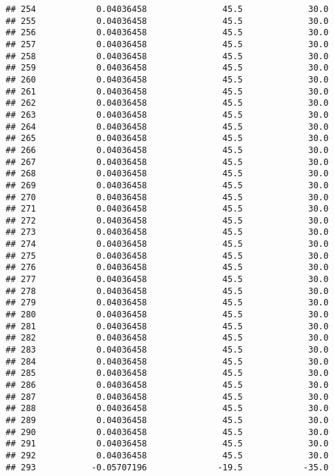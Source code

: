 \documentclass[]{article}
\begin{document}
\begin{verbatim}
## 254            0.04036458               45.5             30.0
## 255            0.04036458               45.5             30.0
## 256            0.04036458               45.5             30.0
## 257            0.04036458               45.5             30.0
## 258            0.04036458               45.5             30.0
## 259            0.04036458               45.5             30.0
## 260            0.04036458               45.5             30.0
## 261            0.04036458               45.5             30.0
## 262            0.04036458               45.5             30.0
## 263            0.04036458               45.5             30.0
## 264            0.04036458               45.5             30.0
## 265            0.04036458               45.5             30.0
## 266            0.04036458               45.5             30.0
## 267            0.04036458               45.5             30.0
## 268            0.04036458               45.5             30.0
## 269            0.04036458               45.5             30.0
## 270            0.04036458               45.5             30.0
## 271            0.04036458               45.5             30.0
## 272            0.04036458               45.5             30.0
## 273            0.04036458               45.5             30.0
## 274            0.04036458               45.5             30.0
## 275            0.04036458               45.5             30.0
## 276            0.04036458               45.5             30.0
## 277            0.04036458               45.5             30.0
## 278            0.04036458               45.5             30.0
## 279            0.04036458               45.5             30.0
## 280            0.04036458               45.5             30.0
## 281            0.04036458               45.5             30.0
## 282            0.04036458               45.5             30.0
## 283            0.04036458               45.5             30.0
## 284            0.04036458               45.5             30.0
## 285            0.04036458               45.5             30.0
## 286            0.04036458               45.5             30.0
## 287            0.04036458               45.5             30.0
## 288            0.04036458               45.5             30.0
## 289            0.04036458               45.5             30.0
## 290            0.04036458               45.5             30.0
## 291            0.04036458               45.5             30.0
## 292            0.04036458               45.5             30.0
## 293           -0.05707196              -19.5            -35.0

\end{verbatim}
\end{document}
